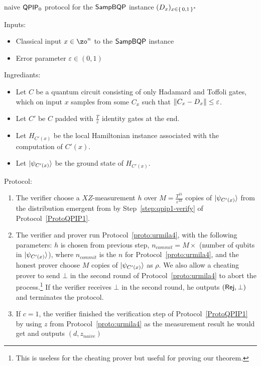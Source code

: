 \begin{protocol}{naive $\operatorname{\mathsf{QPIP}}_0$ protocol  for the $\operatorname{\mathsf{SampBQP}}$ instance $(D_x)_{x\in\set{0, 1}^*}$}
	\label{proto:qpip0_naive}

	Inputs: 
	\begin{itemize}
		\item Classical input $x\in\zo^n$ to the $\operatorname{\mathsf{SampBQP}}$ instance
		\item Error parameter $\varepsilon\in(0, 1)$
	\end{itemize}

 	Ingrediants:
 	\begin{itemize}
 		\item Let $C$ be a quantum circuit consisting of only Hadamard and Toffoli gates, which on input $x$ samples from some $C_x$ such that $\left\lVert C_x-D_x\right\rVert\leq\varepsilon$.
 		\item Let $C'$ be $C$ padded with $\frac{T}{\varepsilon}$ identity gates at the end.
 		\item Let $H_{C'(x)}$ be the local Hamiltonian instance associated with the computation of $C'(x)$.
		\item Let $\ket{\psi_{C'(x)}}$ be the ground state of $H_{C'(x)}$.
 	\end{itemize}

	Protocol:
	\begin{enumerate}
	\item The verifier choose a $XZ$-measurement $h$ over  $M=\frac{T^{21}}{\varepsilon^{33}}$  copies of $\ket{\psi_{C'(x)}}$ from the distribution emergent from by Step~\ref{step:qpip1-verify} of Protocol~\ref{ProtoQPIP1}.
	
	\item The verifier and prover run Protocol~\ref{proto:urmila4}, with the following parameters: $h$ is chosen from previous step, $n_{commit}=M \times$ (number of qubits in $\ket{\psi_{C'(x)}}$), where $n_{commit}$ is the $n$ for Protocol~\ref{proto:urmila4}, and the honest prover choose $M$ copies of $\ket{\psi_{C'(x)}}$ as $\rho$. We also allow a cheating prover to send $\bot$ in the second round of Protocol~\ref{proto:urmila4} to abort the process.\footnote{This is useless for the cheating prover but useful for proving our theorem.} If the verifier receives $\bot$ in the second round, he outputs $(\mathsf{Rej},\bot)$ and terminates the protocol.
	
	\item If $c=1$, the verifier finished the verification step of Protocol~\ref{ProtoQPIP1} by using $z$ from Protocol~\ref{proto:urmila4} as the measurement result he would get and outputs $(d,z_{naive})$
	
	
	\end{enumerate}
\end{protocol}

